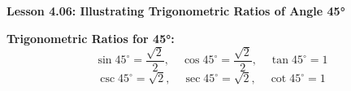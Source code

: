 \begin{center}
\textbf{Lesson 4.06: Illustrating Trigonometric Ratios of Angle 45°}
\end{center}

\vspace*{-1.5ex}

\noindent \textbf{Trigonometric Ratios for 45°:}
    \[
    \sin 45^\circ = \dfrac{\sqrt{2}}{2}, \quad \cos 45^\circ = \dfrac{\sqrt{2}}{2}, \quad \tan 45^\circ = 1
    \]
    \[
    \csc 45^\circ = \sqrt{2}, \quad \sec 45^\circ = \sqrt{2}, \quad \cot 45^\circ = 1
  \]

  
